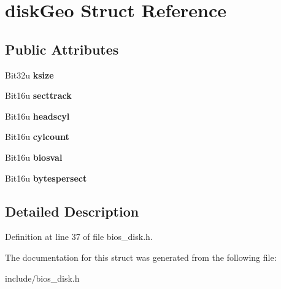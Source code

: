 \hypertarget{structdiskGeo}{\section{disk\-Geo Struct Reference}
\label{structdiskGeo}
}
\subsection*{Public Attributes}
\begin{DoxyCompactItemize}
\item 
\hypertarget{structdiskGeo_abd4f3a12080100ef6625fee835a73f67}{Bit32u {\bfseries ksize}}\label{structdiskGeo_abd4f3a12080100ef6625fee835a73f67}

\item 
\hypertarget{structdiskGeo_a429b8096124fd210c60176218062bea7}{Bit16u {\bfseries secttrack}}\label{structdiskGeo_a429b8096124fd210c60176218062bea7}

\item 
\hypertarget{structdiskGeo_a80d15f791103e8609b0e4fd20b50a55c}{Bit16u {\bfseries headscyl}}\label{structdiskGeo_a80d15f791103e8609b0e4fd20b50a55c}

\item 
\hypertarget{structdiskGeo_a462ae47d0cdb78c1c504d5bd2a388b47}{Bit16u {\bfseries cylcount}}\label{structdiskGeo_a462ae47d0cdb78c1c504d5bd2a388b47}

\item 
\hypertarget{structdiskGeo_a6ebd77ebcb86a90902daa6d223de7b1b}{Bit16u {\bfseries biosval}}\label{structdiskGeo_a6ebd77ebcb86a90902daa6d223de7b1b}

\item 
\hypertarget{structdiskGeo_aab11beac3d73068f943f5bb613fa3b7d}{Bit16u {\bfseries bytespersect}}\label{structdiskGeo_aab11beac3d73068f943f5bb613fa3b7d}

\end{DoxyCompactItemize}


\subsection{Detailed Description}


Definition at line 37 of file bios\-\_\-disk.\-h.



The documentation for this struct was generated from the following file\-:\begin{DoxyCompactItemize}
\item 
include/bios\-\_\-disk.\-h\end{DoxyCompactItemize}
